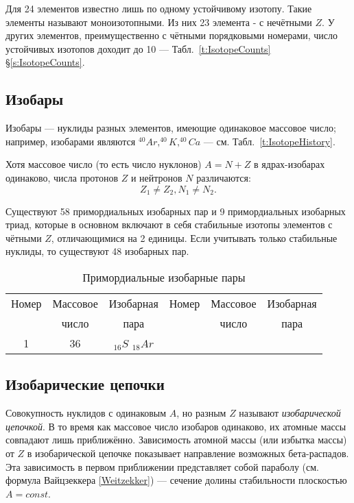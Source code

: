 \documentclass[a5paper,openany]{book}
\begin{document}
Для 24 элементов известно лишь по одному устойчивому изотопу. Такие элементы называют
моноизотопными. Из них 23 элемента - с нечётными $Z$. 
У других элементов, преимущественно с чётными порядковыми номерами, число устойчивых изотопов доходит до 10 --- Табл.~\ref{t:IsotopeCounts} \S\ref{s:IsotopeCounts}. 

\subsection{Изобары}\label{s:Isobars}

Изобары --- нуклиды разных элементов, имеющие одинаковое массовое число; например, изобарами являются $^{40}Ar, ^{40}K, ^{40}Ca$ --- см. Табл.~\ref{t:IsotopeHistory}. 

Хотя массовое число (то есть число нуклонов) $A = N + Z$ в ядрах-изобарах одинаково, числа протонов $Z$ и нейтронов $N$ различаются: 
\begin{equation*}
	Z_{1}\neq Z_{2}, N_{1}\neq N_{2}. 
\end{equation*}

Существуют 58 примордиальных изобарных пар и 9 примордиальных изобарных триад, которые в основном включают в себя стабильные изотопы элементов с чётными $Z$, отличающимися на 2 единицы. Если учитывать только стабильные нуклиды, то существуют 48 изобарных пар.


\begin{table}[!h]
	{\small 
		\begin{center}
			\begin{tabular}{|c|c|c|c|c|c|}
				\hline
				Номер	& Массовое & Изобарная  &	Номер	& Массовое & Изобарная \\
				~	& число	& пара &	~	& число	&  пара\\
				\hline
				1	&36& $_{16}S$ $_{18}Ar$ &	~	& ~	&  ~ \\				
				\hline
			\end{tabular}
		\end{center}	
	}	
	\caption{Примордиальные изобарные пары}
	\label{t:IsobarPairs}
\end{table}

\subsection{Изобарические цепочки}\label{IsobarChains}

Совокупность нуклидов с одинаковым $A$, но разным $Z$ называют \emph{изобарической цепочкой}.  В то время как массовое число изобаров одинаково, их атомные массы совпадают лишь приближённо. Зависимость атомной массы (или избытка массы) от $Z$ в изобарической цепочке показывает направление возможных бета-распадов. Эта зависимость в первом приближении представляет собой параболу (см. формула Вайцзеккера \eqref{Weitzekker}) --- сечение долины стабильности плоскостью $A = const$. 
\end{document}
